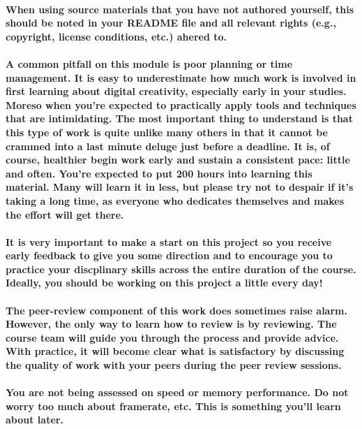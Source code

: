 \documentclass{../../fal_assignment}
\begin{document}
\paragraph{When using source materials that you have not authored yourself, this should be noted in your README file and all relevant rights (e.g., copyright, license conditions, etc.) ahered to.}

\paragraph{A common pitfall on this module is poor planning or time management. It is easy to underestimate how much work is involved in first learning about digital creativity, especially early in your studies. Moreso when you're expected to practically apply tools and techniques that are intimidating. The most important thing to understand is that this type of work is quite unlike many others in that it cannot be crammed into a last minute deluge just before a deadline. It is, of course, healthier begin work early and sustain a consistent pace: little and often. You're expected to put 200 hours into learning this material. Many will learn it in less, but please try not to despair if it's taking a long time, as everyone who dedicates themselves and makes the effort will get there.}

\paragraph{It is very important to make a start on this project so you receive early feedback to give you some direction and to encourage you to practice your discplinary skills across the entire duration of the course. Ideally, you should be working on this project a little every day!}

\paragraph{The peer-review component of this work does sometimes raise alarm. However, the only way to learn how to review is by reviewing. The course team will guide you through the process and provide advice. With practice, it will become clear what is satisfactory by discussing the quality of work with your peers during the peer review sessions.} 

\paragraph{You are not being assessed on speed or memory performance. Do not worry too much about framerate, etc. This is something you'll learn about later.}
\end{document}
